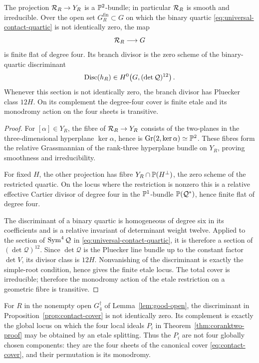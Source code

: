 \begin{proposition}
\label{prop:contact-cover}
The projection $\mathcal R_R\to Y_R$ is a $\mathbb P^2$-bundle; in particular
$\mathcal R_R$ is smooth and irreducible.  Over the open set
$G^\mathrm{fin}_R\subset G$ on which the binary quartic
\eqref{eq:universal-contact-quartic} is not identically zero, the
map
\[
 \mathcal R_R\longrightarrow G
\]
is finite flat of degree four.  Its branch divisor is the zero scheme
of the binary-quartic discriminant
\[
 \operatorname{Disc}(h_R)\in
 H^0\!\left(G,(\det\mathcal Q)^{12}\right).
\]
Whenever this section is not identically zero, the branch divisor has
Pluecker class $12H$.  On its complement the degree-four cover is
finite etale and its monodromy action on the four sheets is transitive.
\end{proposition}
\begin{proof}
For $[\alpha]\in Y_R$, the fibre of
$\mathcal R_R\to Y_R$ consists of the two-planes in the three-dimensional
hyperplane $\ker\alpha$, hence is
$\operatorname{Gr}(2,\ker\alpha)\simeq\mathbb P^2$.  These fibres form the relative
Grassmannian of the rank-three hyperplane bundle on $Y_R$, proving
smoothness and irreducibility.

For fixed $H$, the other projection has fibre
$Y_R\cap\mathbb P(H^\perp)$, the zero scheme of the restricted quartic.
On the locus where the restriction is nonzero this is a relative
effective Cartier divisor of degree four in the $\mathbb P^1$-bundle
$\mathbb P(\mathcal Q^*)$, hence finite flat of degree four.

The discriminant of a binary quartic is homogeneous of degree six in
its coefficients and is a relative invariant of determinant weight
twelve.  Applied to the section of $\operatorname{Sym}^4\mathcal Q$ in
\eqref{eq:universal-contact-quartic}, it is therefore a section of
$(\det\mathcal Q)^{12}$.  Since
$\det\mathcal Q$ is the Pluecker line bundle up to the constant
factor $\det V$, its divisor class is $12H$.  Nonvanishing of the
discriminant is exactly the simple-root condition, hence gives the
finite etale locus.  The total cover is irreducible; therefore the
monodromy action of the etale restriction on a geometric fibre is
transitive.
\end{proof}

For $R$ in the nonempty open $G_4^\dagger$ of
Lemma~\ref{lem:good-open}, the discriminant in
Proposition~\ref{prop:contact-cover} is not identically zero.  Its
complement is exactly the global locus on which the four local ideals
$P_i$ in Theorem~\ref{thm:coranktwo-proof} may be obtained by an
etale splitting.  Thus the $P_i$ are not four globally chosen
components: they are the four sheets of the canonical cover
\eqref{eq:contact-cover}, and their permutation is its monodromy.

